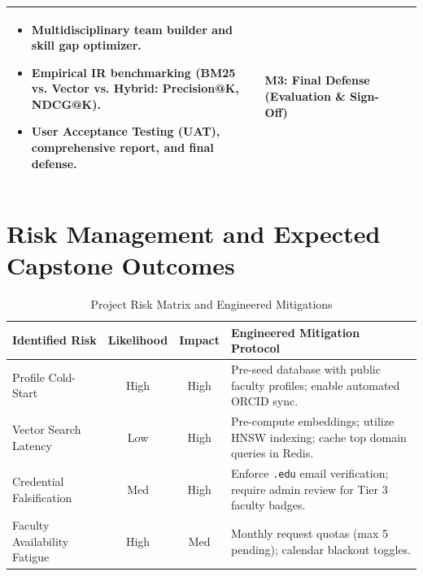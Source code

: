 \documentclass[11pt,a4paper]{article}
\begin{document}
\begin{table}[H]
\begin{tabularx}{\textwidth}{@{}p{2.4cm} p{1.8cm} X p{3.2cm}@{}}
\begin{itemize}[leftmargin=*,noitemsep]
    \item Multidisciplinary team builder and skill gap optimizer.
    \item Empirical IR benchmarking (BM25 vs. Vector vs. Hybrid: Precision@K, NDCG@K).
    \item User Acceptance Testing (UAT), comprehensive report, and final defense.
\end{itemize} & \textbf{M3: Final Defense} \newline (Evaluation \& Sign-Off) \\
\bottomrule
\end{tabularx}
\end{table}

\section{Risk Management and Expected Capstone Outcomes}

\begin{table}[H]
\centering
\small
\caption{Project Risk Matrix and Engineered Mitigations}
\label{tab:risks}
\begin{tabularx}{\textwidth}{@{}p{3.0cm} c c X@{}}
\toprule
\textbf{Identified Risk} & \textbf{Likelihood} & \textbf{Impact} & \textbf{Engineered Mitigation Protocol} \\
\midrule
Profile Cold-Start & High & High & Pre-seed database with public faculty profiles; enable automated ORCID sync. \\
Vector Search Latency & Low & High & Pre-compute embeddings; utilize HNSW indexing; cache top domain queries in Redis. \\
Credential Falsification & Med & High & Enforce \texttt{.edu} email verification; require admin review for Tier 3 faculty badges. \\
Faculty Availability Fatigue & High & Med & Monthly request quotas (max 5 pending); calendar blackout toggles. \\
\bottomrule
\end{tabularx}
\end{table}
\end{document}
